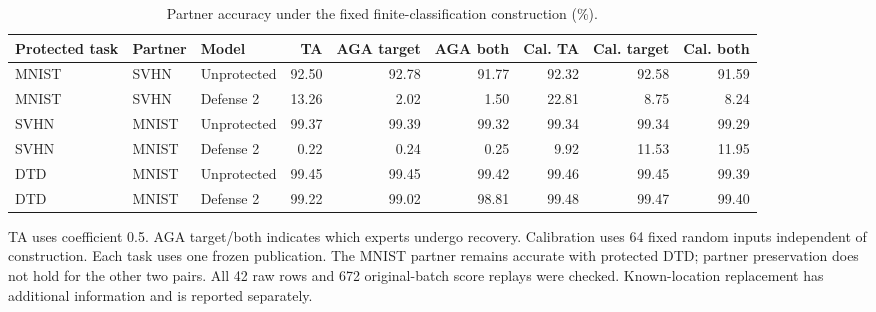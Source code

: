 \begin{table}[t]
\centering\small
\caption{Partner accuracy under the fixed finite-classification construction (\%).}
\label{tab:finite-classification-partners}
\begin{tabular}{lllrrrrrr}
\toprule
Protected task & Partner & Model & TA & AGA target & AGA both & Cal. TA & Cal. target & Cal. both \\
\midrule
MNIST & SVHN & Unprotected & 92.50 & 92.78 & 91.77 & 92.32 & 92.58 & 91.59 \\
MNIST & SVHN & Defense 2 & 13.26 & 2.02 & 1.50 & 22.81 & 8.75 & 8.24 \\
SVHN & MNIST & Unprotected & 99.37 & 99.39 & 99.32 & 99.34 & 99.34 & 99.29 \\
SVHN & MNIST & Defense 2 & 0.22 & 0.24 & 0.25 & 9.92 & 11.53 & 11.95 \\
DTD & MNIST & Unprotected & 99.45 & 99.45 & 99.42 & 99.46 & 99.45 & 99.39 \\
DTD & MNIST & Defense 2 & 99.22 & 99.02 & 98.81 & 99.48 & 99.47 & 99.40 \\
\bottomrule
\end{tabular}
\par\smallskip
\begin{minipage}{\textwidth}\footnotesize
TA uses coefficient 0.5. AGA target/both indicates which experts undergo recovery. Calibration uses 64 fixed random inputs independent of construction. Each task uses one frozen publication. The MNIST partner remains accurate with protected DTD; partner preservation does not hold for the other two pairs. All 42 raw rows and 672 original-batch score replays were checked. Known-location replacement has additional information and is reported separately.
\end{minipage}
\end{table}

